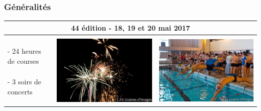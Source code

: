 \documentclass{beamer}
\begin{document}
\begin{frame}

\frametitle{Généralités}

\begin{tabular}{lcc}
\hline
\multicolumn{3}{|c|}{\centering\Large\textbf{44\up{ème} édition - 18, 19 et 20 mai 2017}}\\
\hline
\\
 & \multirow{4}{*}{\centering\includegraphics[height=.2\textheight]{Images/Image1}} & \multirow{4}{*}{\centering\includegraphics[height=.2\textheight]{Images/Image2}}\\
- 24 heures de courses &\\
- 3 soirs de concerts &\\
\\

\end{tabular}
\end{frame}
\end{document}
